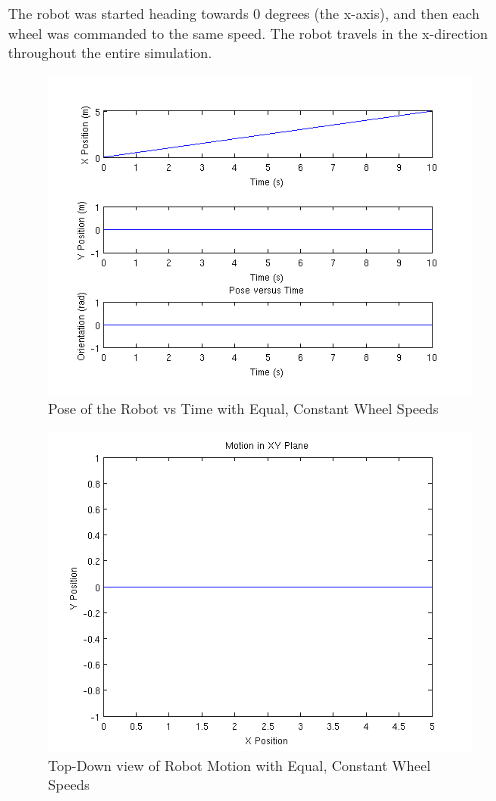 \documentclass[10pt]{amsart}
\begin{document}
The robot was started heading towards 0 degrees (the x-axis), and then each wheel was commanded to the same speed.  The robot travels in the x-direction throughout the entire simulation.

\begin{figure}[h]
 \centering
 \includegraphics[scale=0.5,keepaspectratio=true]{equalconstantpose.png}
 \caption{Pose of the Robot vs Time with Equal, Constant Wheel Speeds}
 \label{fig:equalconstantpose}
\end{figure}

\begin{figure}[h]
 \centering
 \includegraphics[scale=0.5,keepaspectratio=true]{equalconstantplane.png}
 \caption{Top-Down view of Robot Motion with Equal, Constant Wheel Speeds}
 \label{fig:equalconstantplane}
\end{figure}
\end{document}
